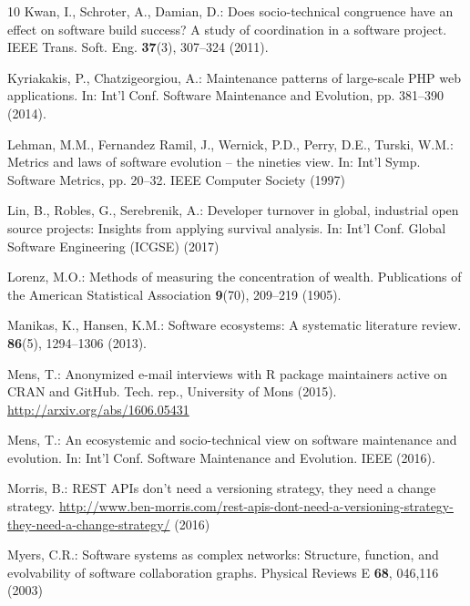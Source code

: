 \documentclass[smallextended]{svjour3}       %
\begin{document}
\begin{thebibliography}{10}
Kwan, I., Schroter, A., Damian, D.: Does socio-technical congruence have an
  effect on software build success? {A} study of coordination in a software
  project.
\newblock IEEE Trans. Soft. Eng. \textbf{37}(3), 307--324 (2011).
\newblock {}

Kyriakakis, P., Chatzigeorgiou, A.: Maintenance patterns of large-scale {PHP}
  web applications.
\newblock In: Int'l Conf. Software Maintenance and Evolution, pp. 381--390
  (2014).
\newblock {}

Lehman, M.M., {Fernandez Ramil}, J., Wernick, P.D., Perry, D.E., Turski, W.M.:
  Metrics and laws of software evolution -- the nineties view.
\newblock In: {Int'l Symp. Software Metrics}, pp. 20--32. IEEE Computer Society
  (1997)

Lin, B., Robles, G., Serebrenik, A.: Developer turnover in global, industrial
  open source projects: Insights from applying survival analysis.
\newblock In: Int'l Conf. Global Software Engineering ({ICGSE}) (2017)

Lorenz, M.O.: Methods of measuring the concentration of wealth.
\newblock Publications of the American Statistical Association \textbf{9}(70),
  209--219 (1905).
\newblock {}

Manikas, K., Hansen, K.M.: Software ecosystems: A systematic literature review.
 \textbf{86}(5), 1294--1306 (2013).
\newblock {}

Mens, T.: Anonymized e-mail interviews with {R} package maintainers active on
  {CRAN} and {GitHub}.
\newblock Tech. rep., University of Mons (2015).
\newblock \urlprefix\url{http://arxiv.org/abs/1606.05431}

Mens, T.: An ecosystemic and socio-technical view on software maintenance and
  evolution.
\newblock In: Int'l Conf. Software Maintenance and Evolution. {IEEE} (2016).
\newblock {}

Morris, B.: {REST} {API}s don't need a versioning strategy, they need a change
  strategy.
\newblock
  \url{http://www.ben-morris.com/rest-apis-dont-need-a-versioning-strategy-they-need-a-change-strategy/}
  (2016)

Myers, C.R.: Software systems as complex networks: Structure, function, and
  evolvability of software collaboration graphs.
\newblock Physical Reviews E \textbf{68}, 046,116 (2003)


\end{thebibliography}
\end{document}
